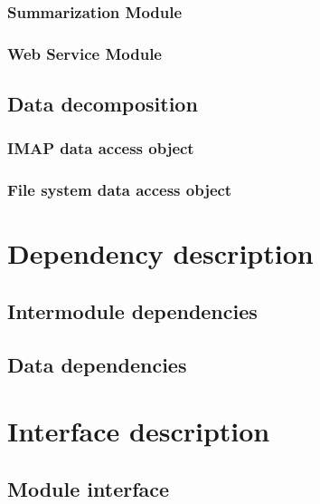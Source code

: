 \documentclass[12pt]{article}
\begin{document}
\subsubsection{Summarization Module}
\subsubsection{Web Service Module}

\subsection{Data decomposition}
\subsubsection{IMAP data access object}
\subsubsection{File system data access object}

\section{Dependency description}
\subsection{Intermodule dependencies}
\subsection{Data dependencies}

\section{Interface description}
\subsection{Module interface}
\end{document}
